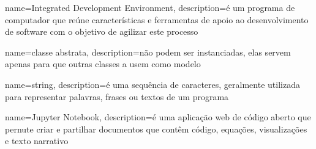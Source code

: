 {
    name={Integrated Development Environment},
    description={é um programa de computador que reúne características e ferramentas de
    apoio ao desenvolvimento de software com o objetivo de agilizar este processo}
}

{
    name={classe abstrata},
    description={não podem ser instanciadas, elas servem apenas para que outras classes
    a usem como modelo}
}

{
    name={string},
    description={é uma sequência de caracteres, geralmente utilizada para representar
    palavras, frases ou textos de um programa}
}

{
    name={Jupyter Notebook},
    description={é uma aplicação web de código aberto que pernute criar e partilhar
    documentos que contêm código, equações, visualizações e texto narrativo}
}
